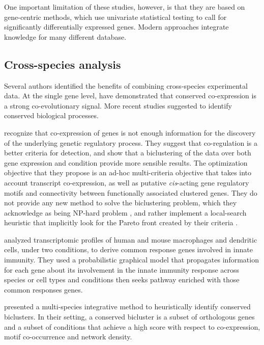
	One important limitation of these studies, however, is that they are based on gene-centric methods, which use univariate statistical testing to call for significantly differentially expressed genes.
	Modern approaches integrate knowledge for many different database.

\subsection{Cross-species analysis}

	Several authors identified the benefits of combining cross-species experimental data.
	At the single gene level, \textcite{noort2003predicting} have demonstrated that conserved co-expression is a strong co-evolutionary signal.
	More recent studies suggested to identify conserved biological processes.

	\Textcite{reiss2006integrated} recognize that co-expression of genes is not enough information for the discovery of the underlying genetic regulatory process.
	They suggest that co-regulation is a better criteria for detection, and show that a biclustering of the data over both gene expression and condition provide more sensible results.
	The optimization objective that they propose is an ad-hoc multi-criteria objective that takes into account transcript co-expression, as well as putative \emph{cis}-acting gene regulatory motifs and connectivity between functionally associated clustered genes.
	They do not provide any new method to solve the biclustering problem, which they acknowledge as being NP-hard problem \parencite{cheng2000biclustering}, and rather implement a local-search heuristic that implicitly look for the Pareto front created by their criteria \parencite{van2003multi}.

	\Textcite{lu2009cross} analyzed transcriptomic profiles of human and mouse macrophages and dendritic cells, under two conditions, to derive common response genes involved in innate immunity.
	They used a probabilistic graphical model that propagates information for each gene about its involvement in the innate immunity response across species or cell types and conditions then seeks pathway enriched with those common responses genes.

	\Textcite{waltman2010multi} presented a multi-species integrative method to heuristically identify conserved biclusters.
	In their setting, a conserved bicluster is a subset of orthologous genes and a subset of conditions that achieve a high score with respect to co-expression, motif co-occurrence and network density.


